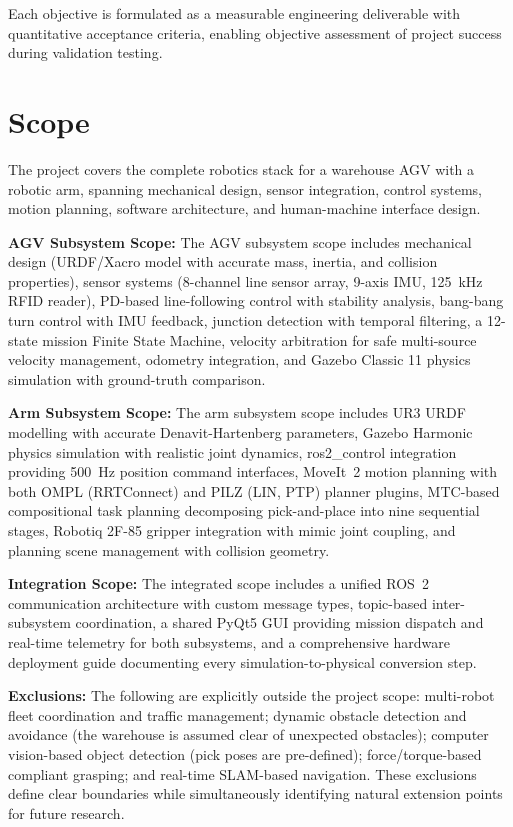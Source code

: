 \documentclass[12pt,a4paper,oneside]{report}
\begin{document}
Each objective is formulated as a measurable engineering deliverable with quantitative acceptance criteria, enabling objective assessment of project success during validation testing.

\section{Scope}

The project covers the complete robotics stack for a warehouse AGV with a robotic arm, spanning mechanical design, sensor integration, control systems, motion planning, software architecture, and human-machine interface design.

\textbf{AGV Subsystem Scope:} The AGV subsystem scope includes mechanical design (URDF/Xacro model with accurate mass, inertia, and collision properties), sensor systems (8-channel line sensor array, 9-axis IMU, 125~kHz RFID reader), PD-based line-following control with stability analysis, bang-bang turn control with IMU feedback, junction detection with temporal filtering, a 12-state mission Finite State Machine, velocity arbitration for safe multi-source velocity management, odometry integration, and Gazebo Classic 11 physics simulation with ground-truth comparison.

\textbf{Arm Subsystem Scope:} The arm subsystem scope includes UR3 URDF modelling with accurate Denavit-Hartenberg parameters, Gazebo Harmonic physics simulation with realistic joint dynamics, ros2\_control integration providing 500~Hz position command interfaces, MoveIt~2 motion planning with both OMPL (RRTConnect) and PILZ (LIN, PTP) planner plugins, MTC-based compositional task planning decomposing pick-and-place into nine sequential stages, Robotiq 2F-85 gripper integration with mimic joint coupling, and planning scene management with collision geometry.

\textbf{Integration Scope:} The integrated scope includes a unified ROS~2 communication architecture with custom message types, topic-based inter-subsystem coordination, a shared PyQt5 GUI providing mission dispatch and real-time telemetry for both subsystems, and a comprehensive hardware deployment guide documenting every simulation-to-physical conversion step.

\textbf{Exclusions:} The following are explicitly outside the project scope: multi-robot fleet coordination and traffic management; dynamic obstacle detection and avoidance (the warehouse is assumed clear of unexpected obstacles); computer vision-based object detection (pick poses are pre-defined); force/torque-based compliant grasping; and real-time SLAM-based navigation. These exclusions define clear boundaries while simultaneously identifying natural extension points for future research.
\end{document}
